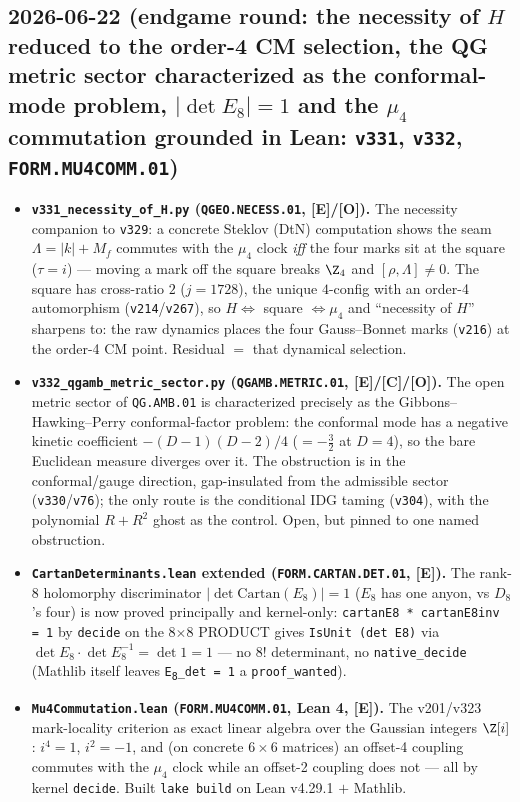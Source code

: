 \documentclass[11pt]{article}
\providecommand{\mE}{\textbf{[E]}}\providecommand{\mC}{\textbf{[C]}}
\providecommand{\mO}{\textbf{[O]}}\providecommand{\mX}{\textbf{[X]}}
\providecommand{\vref}[1]{\texttt{#1}}
\begin{document}
\subsection*{2026-06-22 (endgame round: the necessity of $H$ reduced to the order-4 CM selection, the QG metric sector characterized as the conformal-mode problem, $|\det E_8|{=}1$ and the $\mu_4$ commutation grounded in Lean: \texttt{v331}, \texttt{v332}, \texttt{FORM.MU4COMM.01})}
\begin{itemize}
\item \textbf{\texttt{v331\_necessity\_of\_H.py} (\texttt{QGEO.NECESS.01}, \mE/\mO).} The necessity companion to
  \texttt{v329}: a concrete Steklov (DtN) computation shows the seam $\Lambda{=}|k|{+}M_f$ commutes with the $\mu_4$
  clock \emph{iff} the four marks sit at the square ($\tau{=}i$) --- moving a mark off the square breaks $\Z_4$ and
  $[\rho,\Lambda]\neq0$.  The square has cross-ratio $2$ ($j{=}1728$), the unique $4$-config with an order-4
  automorphism (\vref{v214}/\vref{v267}), so $H\Leftrightarrow$ square $\Leftrightarrow\mu_4$ and ``necessity of
  $H$'' sharpens to: the raw dynamics places the four Gauss--Bonnet marks (\vref{v216}) at the order-4 CM point.
  Residual $=$ that dynamical selection.
\item \textbf{\texttt{v332\_qgamb\_metric\_sector.py} (\texttt{QGAMB.METRIC.01}, \mE/\mC/\mO).} The open metric sector
  of \texttt{QG.AMB.01} is characterized precisely as the Gibbons--Hawking--Perry conformal-factor problem: the
  conformal mode has a negative kinetic coefficient $-(D{-}1)(D{-}2)/4$ (${=}-\tfrac32$ at $D{=}4$), so the bare
  Euclidean measure diverges over it.  The obstruction is in the conformal/gauge direction, gap-insulated from the
  admissible sector (\vref{v330}/\vref{v76}); the only route is the conditional IDG taming (\vref{v304}), with the
  polynomial $R{+}R^2$ ghost as the control.  Open, but pinned to one named obstruction.
\item \textbf{\texttt{CartanDeterminants.lean} extended (\texttt{FORM.CARTAN.DET.01}, \mE).} The rank-8 holomorphy
  discriminator $|\det\mathrm{Cartan}(E_8)|{=}1$ ($E_8$ has one anyon, vs $D_8$'s four) is now proved principally and
  kernel-only: \texttt{cartanE8 * cartanE8inv = 1} by \texttt{decide} on the 8$\times$8 PRODUCT gives
  \texttt{IsUnit (det E8)} via $\det E_8\cdot\det E_8^{-1}{=}\det 1{=}1$ --- no 8! determinant, no
  \texttt{native\_decide} (Mathlib itself leaves \texttt{E\textsubscript{8}\_det = 1} a \texttt{proof\_wanted}).
\item \textbf{\texttt{Mu4Commutation.lean} (\texttt{FORM.MU4COMM.01}, Lean 4, \mE).} The v201/v323 mark-locality
  criterion as exact linear algebra over the Gaussian integers $\Z[i]$: $i^4{=}1$, $i^2{=}-1$, and (on concrete
  $6\times6$ matrices) an offset-4 coupling commutes with the $\mu_4$ clock while an offset-2 coupling does not ---
  all by kernel \texttt{decide}.  Built \texttt{lake build} on Lean v4.29.1 $+$ Mathlib.
\end{itemize}
\end{document}
